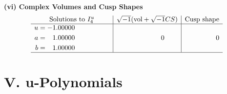 \documentclass[1p]{elsarticle_modified}
\theoremstyle{definition}
\newcommand{\I}{\sqrt{-1}}
\begin{document}
\newpage\flushleft \textbf{(vi) Complex Volumes and Cusp Shapes}
$$\begin{array}{c|c|c}  
\text{Solutions to }I^u_{4}& \I (\text{vol} + \sqrt{-1}CS) & \text{Cusp shape}\\
 \hline 
\begin{aligned}
u &= -1.00000\phantom{ +0.000000I} \\
a &= \phantom{-}1.00000\phantom{ +0.000000I} \\
b &= \phantom{-}1.00000\phantom{ +0.000000I}\end{aligned}
 & \phantom{-0.000000 } 0 & \phantom{-0.000000 } 0\\
 \hline 
 \end{array}$$\newpage
\newpage\renewcommand{\arraystretch}{1}
\centering \section*{ V. u-Polynomials}
\end{document}
